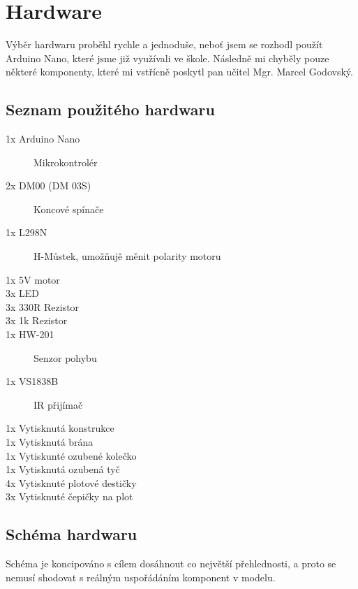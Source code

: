 \documentclass[12pt, a4paper, twoside]{report}
\begin{document}
	
	\chapter{Hardware}
	\noindent Výběr hardwaru proběhl rychle a jednoduše, neboť jsem se rozhodl použít Arduino Nano, které jsme již využívali ve škole. Následně mi chyběly pouze některé komponenty, které mi vstřícně poskytl pan učitel Mgr. Marcel Godovský. \\
	
	\section{Seznam použitého hardwaru}
	
	\begin{description}
		\item  [1x Arduino Nano] Mikrokontrolér
		\item  [2x DM00 (DM 03S)] Koncové spínače
		\item  [1x L298N] H-Můstek, umožňujě měnit polarity motoru
		\item  [1x 5V motor]
		\item  [3x LED]
	    \item  [3x 330R Rezistor]
		\item  [3x 1k Rezistor]
		\item  [1x HW-201] Senzor pohybu
		\item  [1x VS1838B] IR přijímač
		\item  [1x Vytisknutá konstrukce]
		\item  [1x Vytisknutá brána]
		\item  [1x Vytiskunté ozubené kolečko]
		\item  [1x Vytisknutá ozubená tyč]
		\item  [4x Vytisknuté plotové destičky]
		\item  [3x Vytisknuté čepičky na plot]
	\end{description}
	
	\newpage
	
	\section{Schéma hardwaru}
	
	\noindent Schéma je koncipováno s cílem dosáhnout co největší přehlednosti, a proto se nemusí shodovat s reálným uspořádáním komponent v modelu. \\
	
\end{document}
